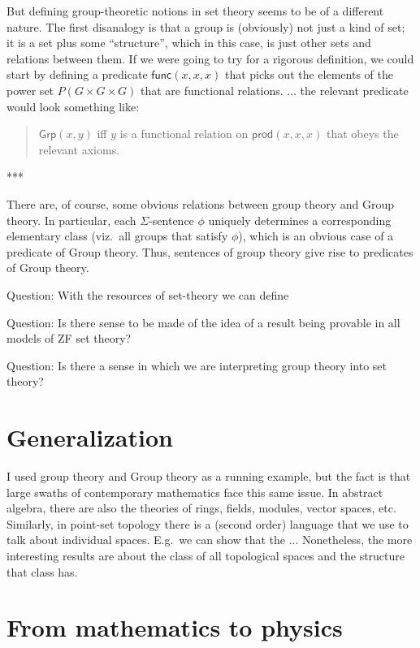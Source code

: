 \documentclass[12pt,fleqn]{article}
\begin{document}
But defining group-theoretic notions in set theory seems to be of a
different nature. The first disanalogy is that a group is (obviously)
not just a kind of set; it is a set plus some ``structure'', which in
this case, is just other sets and relations between them. If we were
going to try for a rigorous definition, we could start by defining a
predicate $\mathsf{func}(x,x,x)$ that picks out the elements of the
power set $P(G\times G\times G)$ that are functional
relations. ... the relevant predicate would look something like:
\begin{quote} $\mathsf{Grp}(x,y)$ iff $y$ is a functional relation on
  $\mathsf{prod}(x,x,x)$ that obeys the relevant axioms. \end{quote}


***

There are, of course, some obvious relations between group theory and
Group theory. In particular, each $\Sigma$-sentence $\phi$ uniquely
determines a corresponding elementary class (viz.\ all groups that
satisfy $\phi$), which is an obvious case of a predicate of Group
theory. Thus, sentences of group theory give rise to predicates of
Group theory.


Question: With the resources of set-theory we can define

Question: Is there sense to be made of the idea of a result being
provable in all models of ZF set theory?

Question: Is there a sense in which we are interpreting group theory
into set theory?

\section{Generalization}

I used group theory and Group theory as a running example, but the
fact is that large swaths of contemporary mathematics face this same
issue. In abstract algebra, there are also the theories of rings,
fields, modules, vector spaces, etc. Similarly, in point-set topology
there is a (second order) language that we use to talk about
individual spaces. E.g.\ we can show that the ... Nonetheless, the
more interesting results are about the class of all topological spaces
and the structure that class has.

\section{From mathematics to physics}
\end{document}
